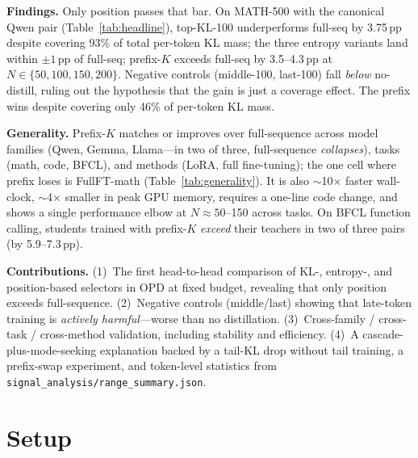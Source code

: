 \documentclass[10pt]{article}
\begin{document}
\textbf{Findings.} Only position passes that bar. On MATH-500 with the canonical Qwen pair (Table~\ref{tab:headline}), top-KL-100 underperforms full-seq by 3.75\,pp despite covering 93\% of total per-token KL mass; the three entropy variants land within $\pm 1$\,pp of full-seq; prefix-$K$ exceeds full-seq by 3.5--4.3\,pp at $N \in \{50, 100, 150, 200\}$. Negative controls (middle-100, last-100) fall \emph{below} no-distill, ruling out the hypothesis that the gain is just a coverage effect. The prefix wins despite covering only 46\% of per-token KL mass.

\textbf{Generality.} Prefix-$K$ matches or improves over full-sequence across model families (Qwen, Gemma, Llama---in two of three, full-sequence \emph{collapses}), tasks (math, code, BFCL), and methods (LoRA, full fine-tuning); the one cell where prefix loses is FullFT-math (Table~\ref{tab:generality}). It is also $\sim$10$\times$ faster wall-clock, $\sim$4$\times$ smaller in peak GPU memory, requires a one-line code change, and shows a single performance elbow at $N \approx 50$--150 across tasks. On BFCL function calling, students trained with prefix-$K$ \emph{exceed} their teachers in two of three pairs (by 5.9--7.3\,pp).

\textbf{Contributions.} (1)~The first head-to-head comparison of KL-, entropy-, and position-based selectors in OPD at fixed budget, revealing that only position exceeds full-sequence. (2)~Negative controls (middle/last) showing that late-token training is \emph{actively harmful}---worse than no distillation. (3)~Cross-family / cross-task / cross-method validation, including stability and efficiency. (4)~A cascade-plus-mode-seeking explanation backed by a tail-KL drop without tail training, a prefix-swap experiment, and token-level statistics from \texttt{signal\_analysis/range\_summary.json}.

\section{Setup}
\label{sec:setup}
\end{document}
